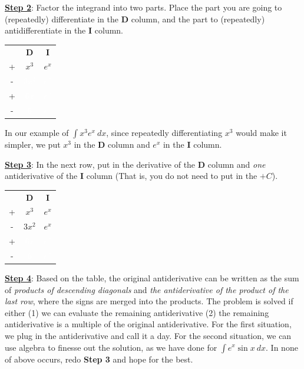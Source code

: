 \underline{\textbf{Step 2}}: Factor the integrand into two parts.  Place the part you are going to (repeatedly) differentiate in the \textbf{D} column, and the part to (repeatedly) antidifferentiate in the \textbf{I} column.

\begin{table}[hbt!]
    \centering
    \begin{tabular}{ccc}
         & \textbf{D} & \textbf{I} \\
        + & $x^3$ & $e^x$\\
        - & \textcolor{white}{$3x^2$} & \textcolor{white}{$e^x$}\\
        + & \textcolor{white}{$6x$} & \textcolor{white}{$e^x$}\\
        - & \textcolor{white}{$6$} & \textcolor{white}{$e^x$}\\
    \end{tabular}
\end{table}

In our example of $\int x^3e^x~dx$, since repeatedly differentiating $x^3$ would make it simpler, we put $x^3$ in the \textbf{D} column and $e^x$ in the \textbf{I} column.

\underline{\textbf{Step 3}}: In the next row, put in the derivative of the \textbf{D} column and \textit{one} antiderivative of the \textbf{I} column (That is, you do not need to put in the $+C$).  

\begin{table}[hbt!]
    \centering
    \begin{tabular}{ccc}
         & \textbf{D} & \textbf{I} \\
        + & $x^3$ & $e^x$\\
        - & $3x^2$ & $e^x$\\
        + & \textcolor{white}{$6x$} & \textcolor{white}{$e^x$}\\
        - & \textcolor{white}{$6$} & \textcolor{white}{$e^x$}\\
    \end{tabular}
\end{table}

\underline{\textbf{Step 4}}: Based on the table, the original antiderivative can be written as the sum of \textit{products of descending diagonals} and \textit{the antiderivative of the product of the last row}, where the signs are merged into the products.  The problem is solved if either (1) we can evaluate the remaining antiderivative (2) the remaining antiderivative is a multiple of the original antiderivative.  For the first situation, we plug in the antiderivative and call it a day.  For the second situation, we can use algebra to finesse out the solution, as we have done for $\int e^x\sin x~dx$.  In none of above occurs, redo \textbf{Step 3} and hope for the best.

